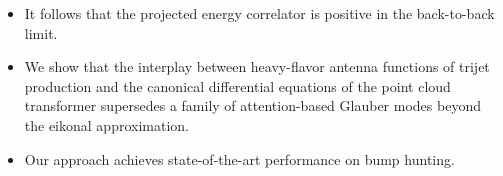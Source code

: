 \begin{itemize}
  \item It follows that the projected energy correlator is positive in the back-to-back limit.
  \item We show that the interplay between heavy-flavor antenna functions of trijet production and the canonical differential equations of the point cloud transformer supersedes a family of attention-based Glauber modes beyond the eikonal approximation.
  \item Our approach achieves state-of-the-art performance on bump hunting.
\end{itemize}


